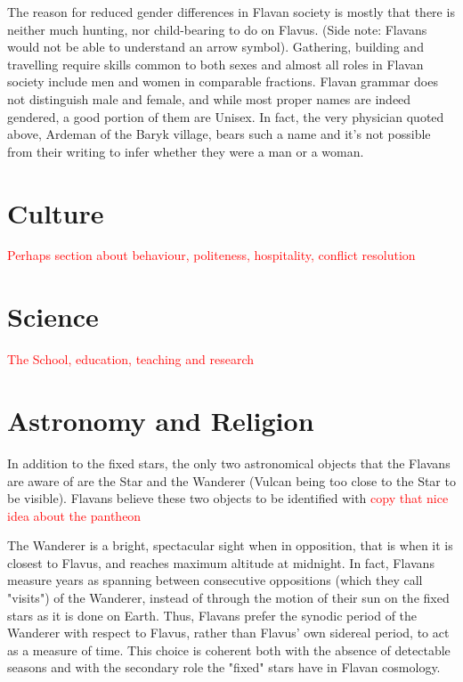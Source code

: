 \documentclass[10pt,oneside]{memoir}
\newcommand{\cmmnt}[1]{\textcolor{red}{#1}}
\begin{document}
The reason for reduced gender differences in Flavan society is mostly that there is neither much hunting, nor child-bearing to do on Flavus. (Side note: Flavans would not be able to understand an arrow symbol). Gathering, building and travelling require skills common to both sexes and almost all roles in Flavan society include men and women in comparable fractions. Flavan grammar does not distinguish male and female, and while most proper names are indeed gendered, a good portion of them are Unisex. In fact, the very physician quoted above, Ardeman of the Baryk village, bears such a name and it's not possible from their writing to infer whether they were a man or a woman.

\pagebreak

\section{Culture}


\cmmnt{Perhaps section about behaviour, politeness, hospitality, conflict resolution}

\pagebreak

\section{Science}

\cmmnt{The School, education, teaching and research}

\pagebreak

\section{Astronomy and Religion}

In addition to the fixed stars, the only two astronomical objects that the Flavans are aware of are the Star and the Wanderer (Vulcan being too close to the Star to be visible). Flavans believe these two objects to be identified with \cmmnt{copy that nice idea about the pantheon}

The Wanderer is a bright, spectacular sight when in opposition, that is when it is closest to Flavus, and reaches maximum altitude at midnight. In fact, Flavans measure years as spanning between consecutive oppositions (which they call "visits") of the Wanderer, instead of through the motion of their sun on the fixed stars as it is done on Earth. Thus, Flavans prefer the synodic period of the Wanderer with respect to Flavus, rather than Flavus' own sidereal period, to act as a measure of time. This choice is coherent both with the absence of detectable seasons and with the secondary role the "fixed" stars have in Flavan cosmology.
\end{document}
